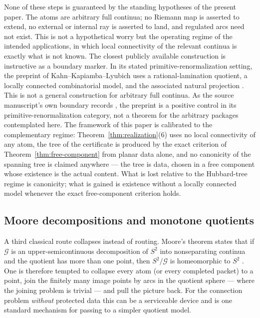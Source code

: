 \documentclass[11pt,reqno]{amsart}
\theoremstyle{definition}
\theoremstyle{remark}
\begin{document}
None of these steps is guaranteed by the standing hypotheses of the
present paper.  The atoms are arbitrary full continua; no Riemann map is
asserted to extend, no external or internal ray is asserted to land, and
regulated arcs need not exist.  This is not a hypothetical worry but the
operating regime of the intended applications, in which local
connectivity of the relevant continua is exactly what is not known.  The
closest publicly available construction is instructive as a boundary
marker.  In its stated primitive-renormalization setting, the preprint of
Kahn--Kapiamba--Lyubich uses a rational-lamination quotient, a locally
connected combinatorial model, and the associated natural projection
\cite[\S\S2.5--2.6]{KKL26}.  This is not a general construction for
arbitrary full continua.  As the source manuscript's own boundary records
\cite{MWman}, the preprint is a positive control in its
primitive-renormalization category, not a theorem for the arbitrary
packages contemplated here.  The framework of this paper is
calibrated to the complementary regime: Theorem~\ref{thm:realization}(6)
uses no local connectivity of any atom, the tree of the certificate is
produced by the exact criterion of Theorem~\ref{thm:free-component} from
planar data alone, and no canonicity of the spanning tree is claimed
anywhere --- the tree is data, chosen in a free component whose existence
is the actual content.  What is lost relative to the Hubbard-tree regime
is canonicity; what is gained is existence without a locally connected
model whenever the exact free-component criterion holds.

\subsection{Moore decompositions and monotone quotients}
\label{subsec:A-comp-moore}

A third classical route collapses instead of routing.  Moore's theorem
states that if $\mathcal G$ is an upper-semicontinuous decomposition of
$S^2$ into nonseparating continua and the quotient has more than one
point, then $S^2/\mathcal G$ is homeomorphic to $S^2$ \cite{Moo25}.
One is therefore tempted to collapse every atom (or every
completed packet) to a point, join the finitely many image points by
arcs in the quotient sphere --- where the joining problem is trivial ---
and pull the picture back.  For the connection problem \emph{without}
protected data this can be a serviceable device and is one standard
mechanism for passing to a simpler quotient model.
\end{document}

